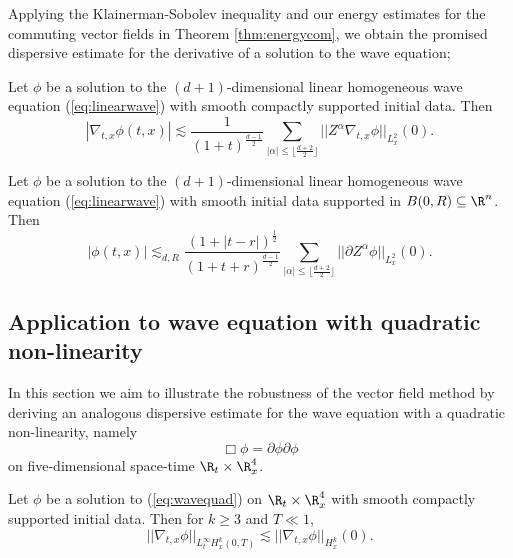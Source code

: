 Applying the Klainerman-Sobolev inequality and our energy estimates for the commuting vector fields in Theorem \ref{thm:energycom}, we obtain the promised dispersive estimate for the derivative of a solution to the wave equation;

\begin{corollary}
	Let $\phi$ be a solution to the $(d + 1)$-dimensional linear homogeneous wave equation (\ref{eq:linearwave}) with smooth compactly supported initial data. Then
		\[ |\nabla_{t, x} \phi (t, x)| \lesssim \frac{1}{(1 + t)^{\frac{d - 1}{2}}} \sum_{|\alpha| \leq \lfloor \frac{d + 2}{2} \rfloor} ||Z^{\alpha} \nabla_{t, x} \phi ||_{L^2_x} (0).  \] \label{cor:totaldisp}
\end{corollary}

\begin{corollary}
	Let $\phi$ be a solution to the $(d + 1)$-dimensional linear homogeneous wave equation (\ref{eq:linearwave}) with smooth initial data supported in $B(0, R) \subseteq \R^n$. Then
		\[ |\phi (t, x)| \lesssim_{d, R}  \frac{(1 + |t - r|)^{\frac12}}{(1 + t + r)^{\frac{d - 1}{2}} }\sum_{|\alpha| \leq \lfloor \frac{d + 2}{2} \rfloor} ||\partial Z^\alpha \phi||_{L^2_x} (0). \] \label{cor:goodlemma}
\end{corollary}

\subsection{Application to wave equation with quadratic non-linearity}

In this section we aim to illustrate the robustness of the vector field method by deriving an analogous dispersive estimate for the wave equation with a quadratic non-linearity, namely 
	\begin{equation}
		\Box \phi = \partial \phi \partial \phi 	\label{eq:wavequad}
	\end{equation}	
on five-dimensional space-time $\R_t \times \R^4_x$. 

\begin{proposition}
	Let $\phi$ be a solution to (\ref{eq:wavequad}) on $\R_t \times \R^4_x$ with smooth compactly supported initial data. Then for $k \geq 3$ and $T \ll 1$, 
		\[ ||\nabla_{t, x} \phi||_{L^\infty_t H^k_x (0, T)} \lesssim || \nabla_{t, x} \phi ||_{H^k_x} (0).  \]	
\end{proposition}


